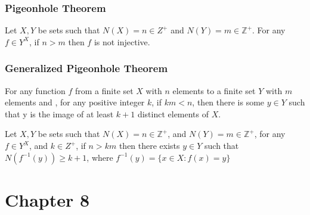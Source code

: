 \documentclass[12pt]{book}
\newcommand{\Z}{\mathbb{Z}}
\newcommand{\paren}[1]{\left( #1 \right)}
\begin{document}
\subsubsection{Pigeonhole Theorem} 
Let $X,Y$ be sets such that $N(X) = n \in Z^+$ and $N(Y) = m \in \Z^+$. For any $f \in Y^X$, if $n >m$ then $f$ is not injective. 

\subsubsection{Generalized Pigeonhole Theorem}
For any function $f$ from a finite set $X$ with $n$ elements to a finite set $Y$ with $m$ elements and , for any positive integer $k$, if $km <n$, then there is some $y\in Y$ such that y is the image of at least $k+1$ distinct elements of $X$.

Let $X,Y$ be sets such that $N(X) = n \in \Z^+$, and $N(Y) = m \in \Z^+$, for any $f \in Y^X$, and $k \in Z^+$, if $n >km$ then there exists $y \in Y$ such that $N\paren{f^{-1}(y)} \geq k+1$, where $f^{-1}(y) = \{ x\in X \colon f(x) = y\}$


\section{Chapter 8}
\end{document}
